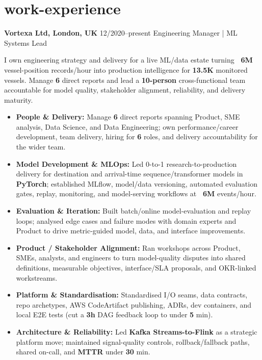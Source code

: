 \documentclass[]{../../../../friggeri-cv}
\renewcommand{\entry}[4]{%
  \parbox[t]{\dimexpr\textwidth-\entryleftinset\relax}{%
    \textbf{#2}%
    {\footnotesize\addfontfeature{Color=lightgray}\hspace{0.6em}#1}%
    \hfill%
    {\small\color{textcolor} #3}\\%
    #4\vspace{\parsep}%
  }\\}
\begin{document}
\section{work-experience}
\begin{entrylist}
    \entry
    {12/2020--present}
    {Vortexa Ltd, London, UK}
    {Engineering Manager | ML Systems Lead}
    {
        {\normalsize
        \setlength{\parindent}{0pt}
        \setlength{\leftskip}{0pt}
        I own engineering strategy and delivery for a live ML/data estate turning \textbf{~6M} vessel-position records/hour into production intelligence for \textbf{13.5K} monitored vessels. Manage \textbf{6} direct reports and lead a \textbf{10-person} cross-functional team accountable for model quality, stakeholder alignment, reliability, and delivery maturity.

        }
        \begin{itemize}[leftmargin=1.1em]
            \item \normalsize\textbf{People \& Delivery:} Manage \textbf{6} direct reports spanning Product, SME analysis, Data Science, and Data Engineering; own performance/career development, team delivery, hiring for \textbf{6} roles, and delivery accountability for the wider team.
            \item \normalsize\textbf{Model Development \& MLOps:} Led 0-to-1 research-to-production delivery for destination and arrival-time sequence/transformer models in \textbf{PyTorch}; established MLflow, model/data versioning, automated evaluation gates, replay, monitoring, and model-serving workflows at \textbf{~6M} events/hour.
            \item \normalsize\textbf{Evaluation \& Iteration:} Built batch/online model-evaluation and replay loops; analysed edge cases and failure modes with domain experts and Product to drive metric-guided model, data, and interface improvements.
            \item \normalsize\textbf{Product / Stakeholder Alignment:} Ran workshops across Product, SMEs, analysts, and engineers to turn model-quality disputes into shared definitions, measurable objectives, interface/SLA proposals, and OKR-linked workstreams.
            \item \normalsize\textbf{Platform \& Standardisation:} Standardised I/O seams, data contracts, repo archetypes, AWS CodeArtifact publishing, ADRs, dev containers, and local E2E tests (cut a \textbf{3h} DAG feedback loop to under \textbf{5} min).
            \item \normalsize\textbf{Architecture \& Reliability:} Led \textbf{Kafka Streams-to-Flink} as a strategic platform move; maintained signal-quality controls, rollback/fallback paths, shared on-call, and \textbf{MTTR} under \textbf{30} min.

\end{itemize}}
\end{entrylist}
\end{document}
